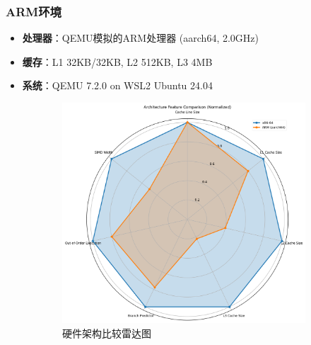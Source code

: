 \documentclass[a4paper,colorlinks=true,linkcolor=blue,urlcolor=blue,citecolor=green,bookmarks=true]{article}
\begin{document}
\subsubsection{ARM环境}
\begin{itemize}
  \item \textbf{处理器}：QEMU模拟的ARM处理器 (aarch64, 2.0GHz)
  \item \textbf{缓存}：L1 32KB/32KB, L2 512KB, L3 4MB
  \item \textbf{系统}：QEMU 7.2.0 on WSL2 Ubuntu 24.04
\end{itemize}

\begin{figure}[htbp]
  \centering
  \begin{subfigure}[b]{0.48\textwidth}
    \centering
    \includegraphics[width=\textwidth]{architecture_comparison.png}
    \caption{硬件架构比较雷达图}
    \label{fig:hardware_config}
  \end{subfigure}
  \hfill
  \begin{subfigure}[b]{0.48\textwidth}
    \centering

\end{subfigure}
\end{figure}
\end{document}
